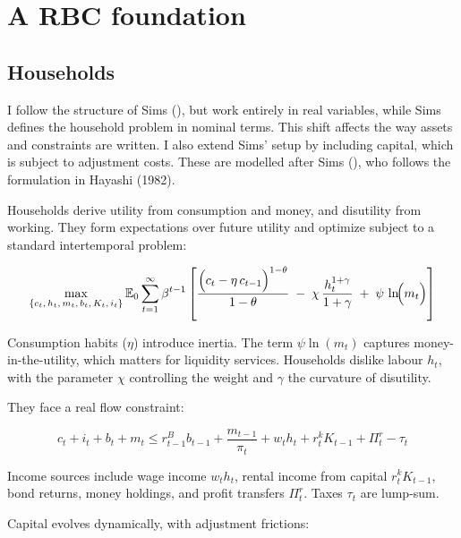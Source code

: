 \documentclass[11pt,preprint]{elsarticle}
\numberwithin{equation}{section}
\numberwithin{figure}{section}
\numberwithin{table}{section}
\begin{document}
\section{A RBC foundation}\label{a-rbc-foundation}

\subsection{Households}\label{households}

I follow the structure of Sims
(), but work entirely in real
variables, while Sims defines the household problem in nominal terms.
This shift affects the way assets and constraints are written. I also
extend Sims' setup by including capital, which is subject to adjustment
costs. These are modelled after Sims
(), who follows the formulation in
Hayashi (1982).

Households derive utility from consumption and money, and disutility
from working. They form expectations over future utility and optimize
subject to a standard intertemporal problem:

\begin{equation}
\max_{\{c_t,\,h_t,\,m_t,\,b_t,\,K_t,\,i_t\}}
\mathbb{E}_0 \sum_{t=1}^{\infty} \beta^{t-1}
\left[
\frac{\Bigl(c_t - \eta\,c_{t-1}\Bigr)^{1-\theta}}{1-\theta}
\;-\;\chi\,\frac{h_t^{1+\gamma}}{1+\gamma}
\;+\;\psi\,\ln\!\Bigl(m_t\Bigr)
\right]
\label{lifetime_utility_real}
\end{equation}

Consumption habits (\(\eta\)) introduce inertia. The term
\(\psi \ln(m_t)\) captures money-in-the-utility, which matters for
liquidity services. Households dislike labour \(h_t\), with the
parameter \(\chi\) controlling the weight and \(\gamma\) the curvature
of disutility.

They face a real flow constraint:

\begin{equation}
c_t + i_t + b_t + m_t \leq r^B_{t-1}b_{t-1} + \dfrac{m_{t-1}}{\pi_t} + w_t h_t + r^k_t K_{t-1} + \Pi^r_t - \tau_t
\label{flow_constraint_real}
\end{equation}

Income sources include wage income \(w_t h_t\), rental income from
capital \(r^k_t K_{t-1}\), bond returns, money holdings, and profit
transfers \(\Pi^r_t\). Taxes \(\tau_t\) are lump-sum.

Capital evolves dynamically, with adjustment frictions:
\end{document}
